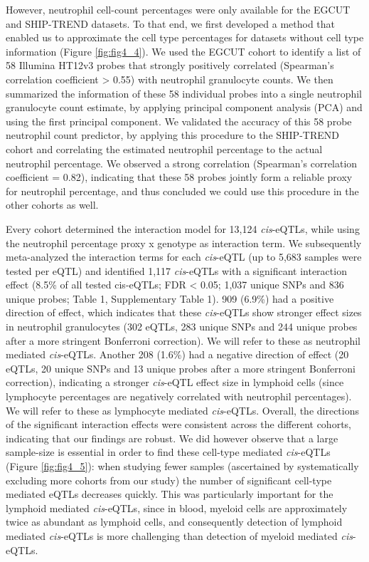   However, neutrophil cell-count percentages were only available for the EGCUT and SHIP-TREND datasets. 
  To that end, we first developed a method that enabled us to approximate the cell type percentages for 
  datasets without cell type information (Figure \ref{fig:fig4_4}). We used the EGCUT cohort to identify a list of 58 
  Illumina HT12v3 probes that strongly positively correlated (Spearman's correlation coefficient > 0.55) 
  with neutrophil granulocyte counts. We then summarized the information of these 58 individual probes 
  into a single neutrophil granulocyte count estimate, by applying principal component analysis (PCA) 
  and using the first principal component. We validated the accuracy of this 58 probe neutrophil count 
  predictor, by applying this procedure to the SHIP-TREND cohort and correlating the estimated neutrophil 
  percentage to the actual neutrophil percentage. We observed a strong correlation (Spearman's correlation 
  coefficient = 0.82), indicating that these 58 probes jointly form a reliable proxy for neutrophil 
  percentage, and thus concluded we could use this procedure in the other cohorts as well.

  Every cohort determined the interaction model for 13,124 \emph{cis}-eQTLs, while using the neutrophil 
  percentage proxy x genotype as interaction term. We subsequently meta-analyzed the interaction 
  terms for each \emph{cis}-eQTL (up to 5,683 samples were tested per eQTL) and identified 1,117 \emph{cis}-eQTLs 
  with a significant interaction effect (8.5\% of all tested cis-eQTLs; FDR < 0.05; 1,037 unique SNPs 
  and 836 unique probes; Table 1, Supplementary Table 1). 909 (6.9\%) had a positive direction of 
  effect, which indicates that these \emph{cis}-eQTLs show stronger effect sizes in neutrophil granulocytes 
  (302 eQTLs, 283 unique SNPs and 244 unique probes after a more stringent Bonferroni correction). We 
  will refer to these as neutrophil mediated \emph{cis}-eQTLs. Another 208 (1.6\%) had a negative direction of 
  effect (20 eQTLs, 20 unique SNPs and 13 unique probes after a more stringent Bonferroni correction), 
  indicating a stronger \emph{cis}-eQTL effect size in lymphoid cells (since lymphocyte percentages are 
  negatively correlated with neutrophil percentages). We will refer to these 
  as lymphocyte mediated \emph{cis}-eQTLs. Overall, the directions of the significant interaction effects were 
  consistent across the different cohorts, indicating that our findings are robust. We did however observe 
  that a large sample-size is essential in order to find these cell-type mediated \emph{cis}-eQTLs (Figure 
  \ref{fig:fig4_5}): when studying fewer samples (ascertained by systematically excluding more cohorts from 
  our study) the number of significant cell-type mediated eQTLs decreases quickly. This was particularly 
  important for the lymphoid mediated \emph{cis}-eQTLs, since in blood, myeloid cells are approximately 
  twice as abundant as lymphoid cells, and consequently detection of lymphoid mediated \emph{cis}-eQTLs is 
  more challenging than detection of myeloid mediated \emph{cis}-eQTLs.

